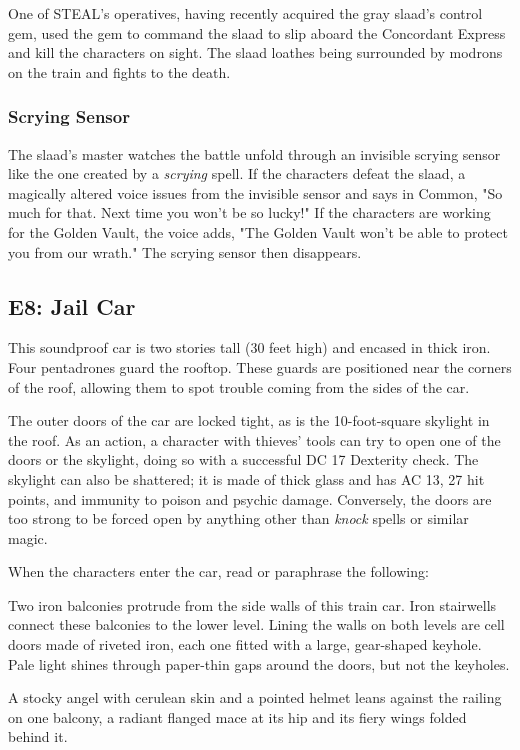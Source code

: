 \documentclass[10pt,a4paper,twoside,bg=print,twocolumn,openany,nodeprecatedcode]{dndarticle}
\begin{document}
One of STEAL's operatives, having recently acquired the gray slaad's control gem, used the gem to command the slaad to slip aboard the Concordant Express and kill the characters on sight. The slaad loathes being surrounded by modrons on the train and fights to the death.

\subsubsection{Scrying Sensor}
The slaad's master watches the battle unfold through an invisible scrying sensor like the one created by a \textit{scrying} spell. If the characters defeat the slaad, a magically altered voice issues from the invisible sensor and says in Common, "So much for that. Next time you won't be so lucky!" If the characters are working for the Golden Vault, the voice adds, "The Golden Vault won't be able to protect you from our wrath." The scrying sensor then disappears.

\subsection{E8: Jail Car}
This soundproof car is two stories tall (30 feet high) and encased in thick iron. Four pentadrones guard the rooftop. These guards are positioned near the corners of the roof, allowing them to spot trouble coming from the sides of the car.

The outer doors of the car are locked tight, as is the 10-foot-square skylight in the roof. As an action, a character with thieves' tools can try to open one of the doors or the skylight, doing so with a successful DC 17 Dexterity check. The skylight can also be shattered; it is made of thick glass and has AC 13, 27 hit points, and immunity to poison and psychic damage. Conversely, the doors are too strong to be forced open by anything other than \textit{knock} spells or similar magic.

When the characters enter the car, read or paraphrase the following:

\begin{DndReadAloud}{}
Two iron balconies protrude from the side walls of this train car. Iron stairwells connect these balconies to the lower level. Lining the walls on both levels are cell doors made of riveted iron, each one fitted with a large, gear-shaped keyhole. Pale light shines through paper-thin gaps around the doors, but not the keyholes.

A stocky angel with cerulean skin and a pointed helmet leans against the railing on one balcony, a radiant flanged mace at its hip and its fiery wings folded behind it.

\end{DndReadAloud}
\end{document}
